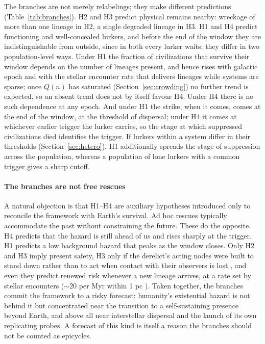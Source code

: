 \documentclass[preprint,12pt]{elsarticle}
\theoremstyle{definition}
\begin{document}
The branches are not merely relabelings; they make different predictions (Table~\ref{tab:branches}). H2 and H3 predict physical remains nearby: wreckage of more than one lineage in H2, a single degraded lineage in H3. H1 and H4 predict functioning and well-concealed lurkers, and before the end of the window they are indistinguishable from outside, since in both every lurker waits; they differ in two population-level ways. Under H1 the fraction of civilizations that survive their window depends on the number of lineages present, and hence rises with galactic epoch and with the stellar encounter rate that delivers lineages while systems are sparse; once $Q(n)$ has saturated (Section~\ref{sec:crowding}) no further trend is expected, so an absent trend does not by itself favour H4. Under H4 there is no such dependence at any epoch. And under H1 the strike, when it comes, comes at the end of the window, at the threshold of dispersal; under H4 it comes at whichever earlier trigger the lurker carries, so the stage at which suppressed civilizations died identifies the trigger. If lurkers within a system differ in their thresholds (Section~\ref{sec:hetero}), H1 additionally spreads the stage of suppression across the population, whereas a population of lone lurkers with a common trigger gives a sharp cutoff.

\paragraph{The branches are not free rescues}
A natural objection is that H1--H4 are auxiliary hypotheses introduced only to reconcile the framework with Earth's survival. Ad hoc rescues typically accommodate the past without constraining the future. These do the opposite. H4 predicts that the hazard is still ahead of us and rises sharply at the trigger. H1 predicts a low background hazard that peaks as the window closes. Only H2 and H3 imply present safety, H3 only if the derelict's acting nodes were built to stand down rather than to act when contact with their observers is lost \citep{Lopin2026b}, and even they predict renewed risk whenever a new lineage arrives, at a rate set by stellar encounters ($\sim\!20$ per Myr within 1 pc \citep{BailerJones2018}). Taken together, the branches commit the framework to a risky forecast: humanity's existential hazard is not behind it but concentrated near the transition to a self-sustaining presence beyond Earth, and above all near interstellar dispersal and the launch of its own replicating probes. A forecast of this kind is itself a reason the branches should not be counted as epicycles.
\end{document}
